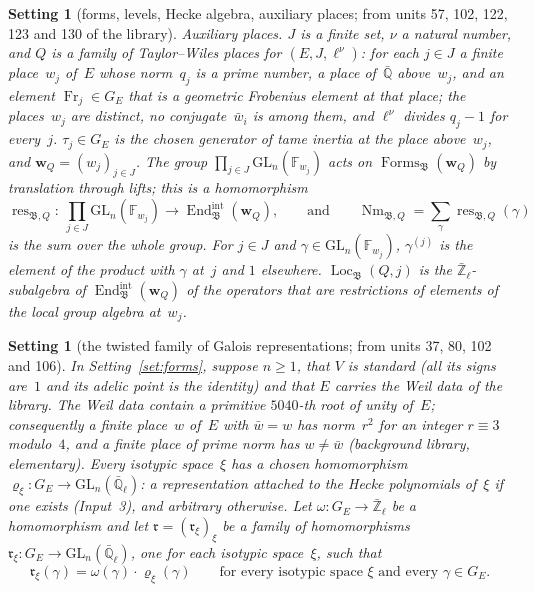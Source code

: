 \documentclass[11pt,a4paper]{article}
\newcommand{\kw}[1]{\emph{#1}}
\newcommand{\m}[1]{\mbox{$#1$}}        %
\theoremstyle{plainx}
\theoremstyle{uprightx}
\newtheorem{setting}[theorem]{Setting}          %
\newcommand{\Zl}{\bar{\mathbb{Z}}_\ell}
\newcommand{\Ql}{\bar{\mathbb{Q}}_\ell}
\newcommand{\Qbar}{\bar{\mathbb{Q}}}
\newcommand{\GE}{G_E}
\newcommand{\Fw}[1]{\mathbb{F}_{#1}}
\newcommand{\GL}{\mathrm{GL}}
\newcommand{\Forms}{\operatorname{Forms}}
\newcommand{\Eint}{\operatorname{End}^{\mathrm{int}}}
\newcommand{\Loc}{\operatorname{Loc}}
\newcommand{\res}{\operatorname{res}}
\newcommand{\Nm}{\operatorname{Nm}}
\newcommand{\fB}{\mathfrak{B}}
\newcommand{\rr}{\mathfrak{r}}
\newcommand{\bw}{\mathbf{w}}
\newcommand{\Fr}{\operatorname{Fr}}
\newcommand{\EQ}{\Eint_{\fB}(\bw_Q)}
\newcommand{\FQ}{\Forms_{\fB}(\bw_Q)}
\newcommand{\LQ}[1]{\Loc_{\fB}(Q,#1)}
\newcommand{\rQ}{\res_{\fB,Q}}
\newcommand{\NQ}{\Nm_{\fB,Q}}
\begin{document}
\begin{setting}[forms, levels, Hecke algebra, auxiliary places; from units 57, 102, 122, 123 and 130 of the
library]
\emph{Auxiliary places.} $J$ is a finite set, $\nu$ a natural number, and $Q$ is a family of
\kw{Taylor--Wiles places} for \m{(E,J,\ell^\nu)}: for each \m{j\in J} a finite place~$w_j$ of~$E$ whose norm~$q_j$
is a prime number, a place of~$\Qbar$ above~$w_j$, and an element \m{\Fr_j\in\GE} that is a geometric Frobenius
element at that place; the places~$w_j$ are distinct, no conjugate~$\bar w_i$ is among them, and $\ell^\nu$ divides
\m{q_j-1} for every~$j$. \m{\tau_j\in\GE} is the chosen generator of tame inertia at the place above~$w_j$, and
\m{\bw_Q=(w_j)_{j\in J}}. The group \m{\prod_{j\in J}\GL_n(\Fw{w_j})} acts on \m{\FQ} by translation through lifts;
this is a homomorphism
\[\rQ\colon\ \prod_{j\in J}\GL_n(\Fw{w_j})\longrightarrow\EQ,\qquad\text{and}\qquad
\NQ=\sum_{\gamma}\rQ(\gamma)\]
is the sum over the whole group. For \m{j\in J} and \m{\gamma\in\GL_n(\Fw{w_j})}, \m{\gamma^{(j)}} is the element
of the product with $\gamma$ at~$j$ and $1$ elsewhere. \m{\LQ{j}} is the $\Zl$-subalgebra of \m{\EQ} of the
operators that are restrictions of elements of the local group algebra at~$w_j$.
\end{setting}

\begin{setting}[the twisted family of Galois representations; from units 37, 80, 102 and 106]\label{set:twist}
In Setting~\ref{set:forms}, suppose \m{n\ge1}, that $V$ is \kw{standard} (all its signs are~$1$ and its adelic
point is the identity) and that $E$ carries the Weil data of the library. The Weil data contain a primitive
$5040$-th root of unity of~$E$; consequently a finite place~$w$ of~$E$ with \m{\bar w=w} has norm~\m{r^{2}} for
an integer \m{r\equiv3} modulo~$4$, and a finite place of prime norm has \m{w\ne\bar w} (background
library, elementary). Every isotypic space~$\xi$ has a chosen
homomorphism \m{\varrho_\xi\colon\GE\to\GL_n(\Ql)}: a representation attached to the Hecke polynomials of~$\xi$ if
one exists (Input~3), and arbitrary otherwise. Let \m{\omega\colon\GE\to\Zl} be a homomorphism and let
\m{\rr=(\rr_\xi)_\xi} be a family of homomorphisms \m{\rr_\xi\colon\GE\to\GL_n(\Ql)}, one for each isotypic
space~$\xi$, such that
\[\rr_\xi(\gamma)=\omega(\gamma)\cdot\varrho_\xi(\gamma)\qquad\text{for every isotypic space }\xi\text{ and every }\gamma\in\GE.\]
\end{setting}
\end{document}
